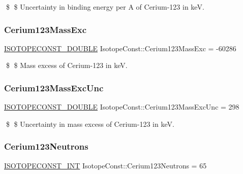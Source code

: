 \$ \$ Uncertainty in binding energy per A of Cerium-\/123 in keV. \mbox{\label{group___isotope_const-_cerium-_ce123_ga1cdfc22c2a9dd17ba0983f25d6d3c963}} 
\subsubsection{\texorpdfstring{Cerium123\+Mass\+Exc}{Cerium123MassExc}}
{\footnotesize\ttfamily \mbox{\hyperlink{group___isotope_const-_macros_ga8f45a7272ce02c0b4c65c44636ed719a}{I\+S\+O\+T\+O\+P\+E\+C\+O\+N\+S\+T\+\_\+\+D\+O\+U\+B\+LE}} Isotope\+Const\+::\+Cerium123\+Mass\+Exc = -\/60286}

\$ \$ Mass excess of Cerium-\/123 in keV. \mbox{\label{group___isotope_const-_cerium-_ce123_ga1fb3f3c59dc6eb5cafd744c3440c1d78}} 
\subsubsection{\texorpdfstring{Cerium123\+Mass\+Exc\+Unc}{Cerium123MassExcUnc}}
{\footnotesize\ttfamily \mbox{\hyperlink{group___isotope_const-_macros_ga8f45a7272ce02c0b4c65c44636ed719a}{I\+S\+O\+T\+O\+P\+E\+C\+O\+N\+S\+T\+\_\+\+D\+O\+U\+B\+LE}} Isotope\+Const\+::\+Cerium123\+Mass\+Exc\+Unc = 298}

\$ \$ Uncertainty in mass excess of Cerium-\/123 in keV. \mbox{\label{group___isotope_const-_cerium-_ce123_ga4aefa186ce91c1745e93851e9b60d68d}} 
\subsubsection{\texorpdfstring{Cerium123\+Neutrons}{Cerium123Neutrons}}
{\footnotesize\ttfamily \mbox{\hyperlink{group___isotope_const-_macros_ga5f18360b3e99483a35c32d789e62621c}{I\+S\+O\+T\+O\+P\+E\+C\+O\+N\+S\+T\+\_\+\+I\+NT}} Isotope\+Const\+::\+Cerium123\+Neutrons = 65}

